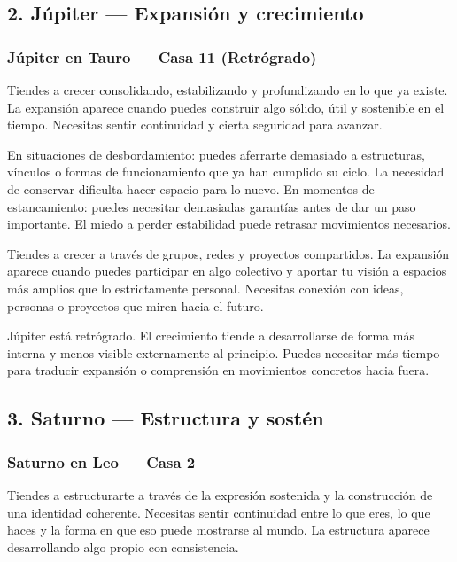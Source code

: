 \documentclass[11pt,a4paper]{article}
\begin{document}
\subsection{2. Júpiter — Expansión y crecimiento}

\subsubsection*{
Júpiter en Tauro
— Casa 11 (Retrógrado)
}

Tiendes a crecer consolidando, estabilizando y profundizando en lo que ya existe. La expansión aparece cuando puedes construir algo sólido, útil y sostenible en el tiempo. Necesitas sentir continuidad y cierta seguridad para avanzar.

En situaciones de desbordamiento: puedes aferrarte demasiado a estructuras, vínculos o formas de funcionamiento que ya han cumplido su ciclo. La necesidad de conservar dificulta hacer espacio para lo nuevo. En momentos de estancamiento: puedes necesitar demasiadas garantías antes de dar un paso importante. El miedo a perder estabilidad puede retrasar movimientos necesarios.

Tiendes a crecer a través de grupos, redes y proyectos compartidos. La expansión aparece cuando puedes participar en algo colectivo y aportar tu visión a espacios más amplios que lo estrictamente personal. Necesitas conexión con ideas, personas o proyectos que miren hacia el futuro.

Júpiter está retrógrado. El crecimiento tiende a desarrollarse de forma más interna y menos visible externamente al principio. Puedes necesitar más tiempo para traducir expansión o comprensión en movimientos concretos hacia fuera.

\vspace{0.8cm}


\subsection{3. Saturno — Estructura y sostén}

\subsubsection*{
Saturno en Leo
— Casa 2
}

Tiendes a estructurarte a través de la expresión sostenida y la construcción de una identidad coherente. Necesitas sentir continuidad entre lo que eres, lo que haces y la forma en que eso puede mostrarse al mundo. La estructura aparece desarrollando algo propio con consistencia.
\end{document}
